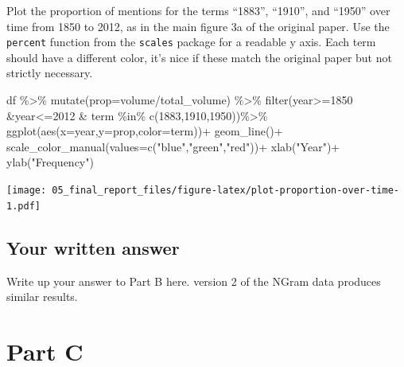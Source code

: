 \documentclass[
]{article}
\newenvironment{Shaded}{\begin{snugshade}}{\end{snugshade}}
\newcommand{\AttributeTok}[1]{\textcolor[rgb]{0.77,0.63,0.00}{#1}}
\newcommand{\DecValTok}[1]{\textcolor[rgb]{0.00,0.00,0.81}{#1}}
\newcommand{\FunctionTok}[1]{\textcolor[rgb]{0.00,0.00,0.00}{#1}}
\newcommand{\NormalTok}[1]{#1}
\newcommand{\SpecialCharTok}[1]{\textcolor[rgb]{0.00,0.00,0.00}{#1}}
\newcommand{\StringTok}[1]{\textcolor[rgb]{0.31,0.60,0.02}{#1}}
\begin{document}
Plot the proportion of mentions for the terms ``1883'', ``1910'', and
``1950'' over time from 1850 to 2012, as in the main figure 3a of the
original paper. Use the \texttt{percent} function from the
\texttt{scales} package for a readable y axis. Each term should have a
different color, it's nice if these match the original paper but not
strictly necessary.

\begin{Shaded}
\begin{Highlighting}[]
\NormalTok{df }\SpecialCharTok{\%\textgreater{}\%} \FunctionTok{mutate}\NormalTok{(}\AttributeTok{prop=}\NormalTok{volume}\SpecialCharTok{/}\NormalTok{total\_volume) }\SpecialCharTok{\%\textgreater{}\%}
  \FunctionTok{filter}\NormalTok{(year}\SpecialCharTok{\textgreater{}=}\DecValTok{1850} \SpecialCharTok{\&}\NormalTok{year}\SpecialCharTok{\textless{}=}\DecValTok{2012} \SpecialCharTok{\&}\NormalTok{ term }\SpecialCharTok{\%in\%} \FunctionTok{c}\NormalTok{(}\DecValTok{1883}\NormalTok{,}\DecValTok{1910}\NormalTok{,}\DecValTok{1950}\NormalTok{))}\SpecialCharTok{\%\textgreater{}\%}
  \FunctionTok{ggplot}\NormalTok{(}\FunctionTok{aes}\NormalTok{(}\AttributeTok{x=}\NormalTok{year,}\AttributeTok{y=}\NormalTok{prop,}\AttributeTok{color=}\NormalTok{term))}\SpecialCharTok{+}
    \FunctionTok{geom\_line}\NormalTok{()}\SpecialCharTok{+}
   \FunctionTok{scale\_color\_manual}\NormalTok{(}\AttributeTok{values=}\FunctionTok{c}\NormalTok{(}\StringTok{"blue"}\NormalTok{,}\StringTok{"green"}\NormalTok{,}\StringTok{"red"}\NormalTok{))}\SpecialCharTok{+}
    \FunctionTok{xlab}\NormalTok{(}\StringTok{"Year"}\NormalTok{)}\SpecialCharTok{+}
    \FunctionTok{ylab}\NormalTok{(}\StringTok{"Frequency"}\NormalTok{)}
\end{Highlighting}
\end{Shaded}

\texttt{[image: 05\_final\_report\_files/figure-latex/plot-proportion-over-time-1.pdf]}

\hypertarget{your-written-answer-1}{%
\subsection{Your written answer}\label{your-written-answer-1}}

Write up your answer to Part B here. version 2 of the NGram data
produces similar results.

\hypertarget{part-c}{%
\section{Part C}\label{part-c}}
\end{document}
